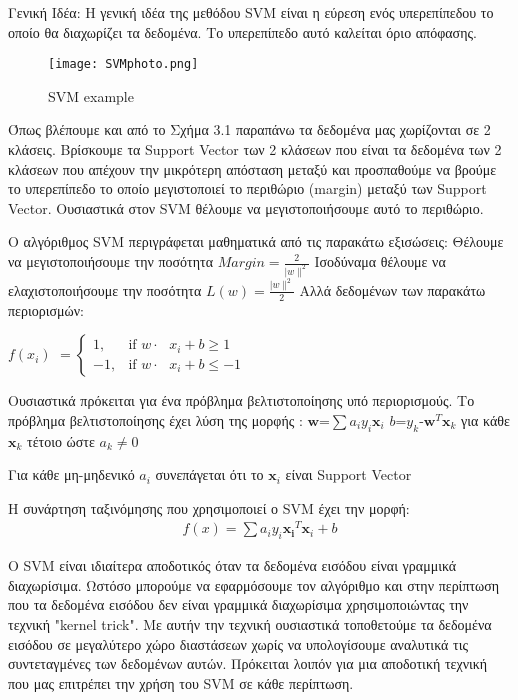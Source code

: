 Γενική Ιδέα: H γενική ιδέα της μεθόδου SVM είναι η εύρεση ενός υπερεπίπεδου το οποίο θα διαχωρίζει τα δεδομένα. Το υπερεπίπεδο αυτό καλείται όριο απόφασης. 


\begin{figure}[h!]
	\texttt{[image: SVMphoto.png]}
	\caption {SVM example}
	\label{fig:SVM}  
\end{figure}

Όπως βλέπουμε και από το Σχήμα 3.1 παραπάνω τα δεδομένα μας χωρίζονται σε 2 κλάσεις. Βρίσκουμε τα
 Support Vector των 2 κλάσεων που είναι τα δεδομένα των 2 κλάσεων που απέχουν την μικρότερη απόσταση
  μεταξύ και προσπαθούμε να βρούμε το υπερεπίπεδο το οποίο μεγιστοποιεί το περιθώριο (margin) μεταξύ
   των Support Vector. Ουσιαστικά στον SVM θέλουμε να μεγιστοποιήσουμε αυτό το περιθώριο.


Ο αλγόριθμος SVM περιγράφεται μαθηματικά από τις παρακάτω εξισώσεις:
\newline
Θέλουμε να μεγιστοποιήσουμε την ποσότητα   $ Margin=\frac{2}{|w\|^2} $
\newline
Ισοδύναμα θέλουμε να ελαχιστοποιήσουμε την ποσότητα  $ L(w)=\frac{|w\|^2}{2} $
\newline
	Αλλά δεδομένων των παρακάτω περιορισμών:


 $f(x_i)$ 
$ = \begin{cases} 1, & \mbox{if } w\cdot\mbox{ $x_i +b \geq 1 $} \\ -1, & \mbox{if } w\cdot\mbox{ $x_i +b \leq -1 $} \end{cases} $


 Ουσιαστικά πρόκειται για ένα πρόβλημα βελτιστοποίησης υπό περιορισμούς.
 Το πρόβλημα βελτιστοποίησης έχει λύση της μορφής :
\newline $\boldsymbol  w $=$\sum a_i y_i \boldsymbol x_i $ $b$=$y_k$-$\boldsymbol w^T \boldsymbol x_k$ για κάθε $\boldsymbol x_k$ τέτοιο ώστε $a_k\not= 0$
 
 Για κάθε μη-μηδενικό $a_i$ συνεπάγεται ότι το $\boldsymbol x_i$ είναι Support Vector
 
 Η συνάρτηση ταξινόμησης που χρησιμοποιεί ο SVM έχει την μορφή:
\begin{align*} 
f(x)=\sum a_i y_i \boldsymbol {x_i}^T \boldsymbol x_i +b
\end{align*}

Ο SVM είναι ιδιαίτερα αποδοτικός όταν τα δεδομένα εισόδου είναι γραμμικά διαχωρίσιμα. Ωστόσο μπορούμε να
 εφαρμόσουμε τον αλγόριθμο και στην περίπτωση που τα δεδομένα εισόδου δεν είναι γραμμικά διαχωρίσιμα
 χρησιμοποιώντας την τεχνική "kernel trick". Με αυτήν την τεχνική ουσιαστικά τοποθετούμε τα δεδομένα εισόδου σε μεγαλύτερο χώρο διαστάσεων χωρίς να υπολογίσουμε αναλυτικά τις συντεταγμένες των δεδομένων αυτών. Πρόκειται λοιπόν για μια αποδοτική τεχνική που μας επιτρέπει την χρήση του SVM σε κάθε περίπτωση.

